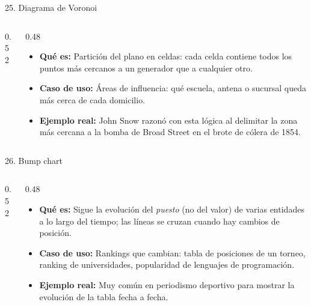 \documentclass[aspectratio=169,9pt]{beamer}
\newcommand{\ficha}[3]{%
\begin{itemize}
\item \textbf{Qué es:} #1
\item \textbf{Caso de uso:} #2
\item \textbf{Ejemplo real:} #3
\end{itemize}}
\begin{document}
\begin{frame}{25. Diagrama de Voronoi}
\begin{columns}[T]
\begin{column}{0.52\textwidth}
\centering
{}
\end{column}
\begin{column}{0.48\textwidth}
\ficha{Partición del plano en celdas: cada celda contiene todos los puntos más cercanos a un generador que a cualquier otro.}
{Áreas de influencia: qué escuela, antena o sucursal queda más cerca de cada domicilio.}
{John Snow razonó con esta lógica al delimitar la zona más cercana a la bomba de Broad Street en el brote de cólera de 1854.}
\end{column}
\end{columns}
\end{frame}

\begin{frame}{26. Bump chart}
\begin{columns}[T]
\begin{column}{0.52\textwidth}
\centering
{}
\end{column}
\begin{column}{0.48\textwidth}
\ficha{Sigue la evolución del \emph{puesto} (no del valor) de varias entidades a lo largo del tiempo; las líneas se cruzan cuando hay cambios de posición.}
{Rankings que cambian: tabla de posiciones de un torneo, ranking de universidades, popularidad de lenguajes de programación.}
{Muy común en periodismo deportivo para mostrar la evolución de la tabla fecha a fecha.}
\end{column}
\end{columns}
\end{frame}
\end{document}
